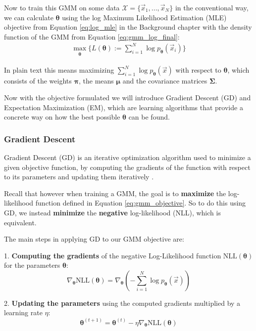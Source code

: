 Now to train this GMM on some data $\mathcal{X} = \{\vec x_1, ..., \vec x_N\}$ in the conventional way, we can calculate $\boldsymbol{\theta}$ using the 
log Maximum Likelihood Estimation (MLE) objective from Equation \ref{eq:log_mle} in the Background chapter with the density function
of the GMM from Equation \ref{eq:gmm_log_final}:
\begin{align}
    \max_{\substack{\boldsymbol{\theta}}} \{ L(\boldsymbol{\theta}) := \sum_{i=1}^{N} \log p_{\boldsymbol{\theta}}(\vec x_i) \}
    \label{eq:gmm_objective}
\end{align}

In plain text this means maximizing $\sum_{i=1}^{N} \log p_{\boldsymbol{\theta}}(\vec x)$ with respect to $\boldsymbol{\theta}$, which consists of the weights $\boldsymbol \pi$, the means $\boldsymbol \mu$ and the covariance matrices $\boldsymbol \Sigma$.

Now with the objective formulated we will introduce Gradient Descent (GD) and Expectation Maximization (EM), which are learning algorithms
that provide a concrete way on how the best possible $\boldsymbol{\theta}$ can be found. 

\subsubsection{Gradient Descent}
\label{sec:gmm_sgd}

Gradient Descent (GD) is an iterative optimization algorithm used to minimize a given objective function, by  
computing the gradients of the function with respect to its parameters and updating them iteratively \cite{deepl}.

Recall that however when training a GMM, the goal is to \textbf{maximize} the log-likelihood function defined in Equation \ref{eq:gmm_objective}. 
So to do this using GD, we instead \textbf{minimize} the \textbf{negative} log-likelihood (NLL), which is equivalent.

The main steps in applying GD to our GMM objective are: 

1. \textbf{Computing the gradients} of the negative Log-Likelihood function $\text{NLL}(\boldsymbol{\theta})$ for the parameters $\boldsymbol{\theta}$: 
\[
    \nabla_{\boldsymbol{\theta}} \text{NLL}(\boldsymbol{\theta}) = \nabla_{\boldsymbol{\theta}} (- \sum_{i=1}^{N} \log p_{\boldsymbol{\theta}}(\vec x))
\]

2. \textbf{Updating the parameters} using the computed gradients multiplied by a learning rate $\eta$:
\[
    \boldsymbol{\theta}^{(t+1)} = \boldsymbol{\theta}^{(t)} - \eta \nabla_{\boldsymbol{\theta}} \text{NLL}(\boldsymbol{\theta})
\]

